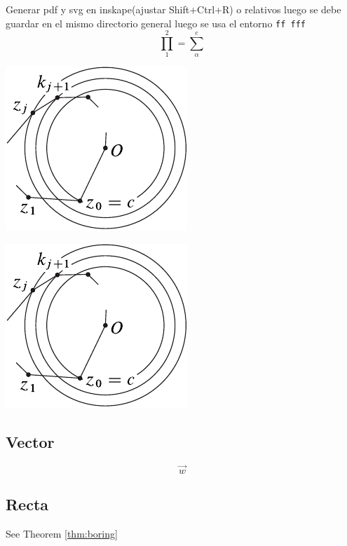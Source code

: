 \documentclass[12pt,]{report}
\let\origfigure=\figure
\let\endorigfigure=\endfigure
\renewenvironment{figure}[1][]{%
  \origfigure[H]
}{%
  \endorigfigure
}
\theoremstyle{slplain}
\begin{document}
Generar pdf y svg en inskape(ajustar Shift+Ctrl+R) o relativos luego se debe guardar en el mismo directorio general luego se usa el entorno \texttt{ff\ fff}
\[\prod_1^2=\sum_{\alpha}^e\]

\begin{figure}[!ht]
\fcapside
  {\caption{some text here to represent the caption}}
  {\includegraphics{inverse}}
\end{figure}

\begin{figure}[!ht]
\fcapside
  {\caption{some text here to represent the caption}}
  {\includegraphics{inverse}}
\end{figure}

\hypertarget{vector}{%
\subsection{Vector}\label{vector}}

\[\vec{w}\]

\hypertarget{recta}{%
\subsection{Recta}\label{recta}}

See Theorem \ref{thm:boring}
\end{document}
